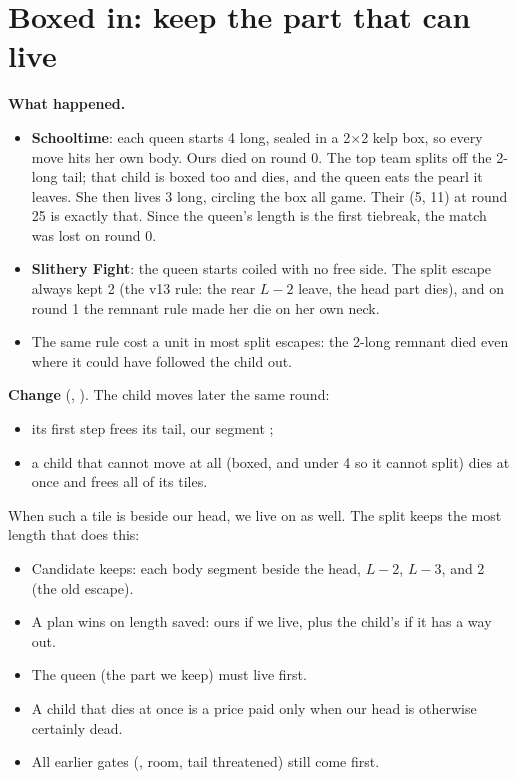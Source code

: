 \documentclass[11pt,a4paper]{article}
\newcommand{\code}[1]{\texttt{\detokenize{#1}}}
\begin{document}
\section{Boxed in: keep the part that can live}\label{sec:keep}
\textbf{What happened.}
\begin{itemize}
      \item \textbf{Schooltime}: each queen starts 4 long, sealed in a 2$\times$2 kelp box, so every move hits her own body. Ours died
            on round 0. The top team splits off the 2-long tail; that child is boxed too and dies, and the queen eats the pearl it
            leaves. She then lives 3 long, circling the box all game. Their (5, 11) at round 25 is exactly that. Since the queen's
            length is the first tiebreak, the match was lost on round 0.
      \item \textbf{Slithery Fight}: the queen starts coiled with no free side. The split escape always kept 2 (the v13 rule: the rear
            $L-2$ leave, the head part dies), and on round 1 the remnant rule made her die on her own neck.
      \item The same rule cost a unit in most split escapes: the 2-long remnant died even where it could have followed the child out.
\end{itemize}
\textbf{Change} (\code{endgame.hpp}, \code{choose_escape}). The child moves later the same round:
\begin{itemize}
      \item its first step frees its tail, our segment \code{keep};
      \item a child that cannot move at all (boxed, and under 4 so it cannot split) dies at once and frees all of its tiles.
\end{itemize}
When such a tile is beside our head, we live on as well. The split keeps the most length that does this:
\begin{itemize}
      \item Candidate keeps: each body segment beside the head, $L-2$, $L-3$, and 2 (the old escape).
      \item A plan wins on length saved: ours if we live, plus the child's if it has a way out.
      \item The queen (the part we keep) must live first.
      \item A child that dies at once is a price paid only when our head is otherwise certainly dead.
      \item All earlier gates (\code{fine}, room, tail threatened) still come first.
\end{itemize}
\end{document}
